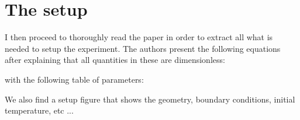 \section*{The setup}

I then proceed to thoroughly read the paper in order to extract all what is needed to setup 
the experiment. 
The authors present the following equations after explaining that all quantities in these
are dimensionless:
\begin{center}
\end{center}
with the following table of parameters:
\begin{center}
\end{center}
We also find a setup figure that shows the geometry, 
boundary conditions, initial temperature, etc ...
\begin{center}
\end{center}

